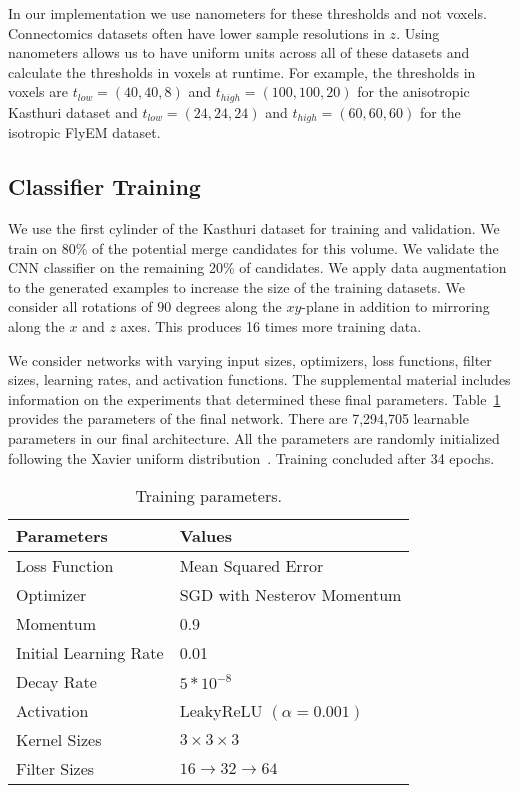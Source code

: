 In our implementation we use nanometers for these thresholds and not voxels. Connectomics datasets often have lower sample resolutions in $z$. Using nanometers allows us to have uniform units across all of these datasets and calculate the thresholds in voxels at runtime. For example, the thresholds in voxels are $t_{low} = (40, 40, 8)$ and $t_{high} = (100, 100, 20)$ for the anisotropic Kasthuri dataset and $t_{low} = (24, 24, 24)$ and $t_{high} = (60, 60, 60)$ for the isotropic FlyEM dataset.


\subsection{Classifier Training}
\label{sec:network-parameters}

We use the first cylinder of the Kasthuri dataset  for training and validation. We train on 80\% of the potential merge candidates for this volume.
We validate the CNN classifier on the remaining 20\% of candidates. We apply data augmentation to the generated examples to increase the size of the training datasets. We consider all rotations of $90$ degrees along the $xy$-plane in addition to mirroring along the $x$ and $z$ axes. This produces 16 times more training data.

We consider networks with varying input sizes, optimizers, loss functions, filter sizes, learning rates, and activation functions. The supplemental material includes information on the experiments that determined these final parameters. Table~\ref{table:architecture} provides the parameters of the final network. There are 7,294,705 learnable parameters in our final architecture. All the parameters are randomly initialized following the Xavier uniform distribution~\cite{glorot2010understanding}. Training concluded after 34 epochs.

\begin{table}[h!]
	\centering
	\begin{tabular}{l l} \hline
		\textbf{Parameters} & \textbf{Values} \\ \hline
		Loss Function & Mean Squared Error \\
		Optimizer & SGD  with Nesterov Momentum \\
		Momentum & 0.9 \\
		Initial Learning Rate & 0.01 \\
		Decay Rate & $5 * 10^{-8}$ \\
		Activation & LeakyReLU $(\alpha = 0.001)$ \\
		Kernel Sizes & $3 \times 3 \times 3$ \\
		Filter Sizes & $16 \to 32 \to 64$ \\ \hline
	\end{tabular}
	\caption{Training parameters.}
	\label{table:architecture}
\end{table}





